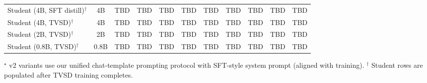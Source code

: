 \begin{table}[t]
{\begin{tabular}{@{}l c cc cc cc c cc@{}}
\rowcolor{blue!5}
Student (4B, SFT distill)$^\dagger$     & 4B    & TBD  & TBD  & TBD & TBD & TBD & TBD & TBD & TBD  & TBD \\
\rowcolor{blue!5}
Student (4B, TVSD)$^\dagger$     & 4B    & TBD  & TBD  & TBD & TBD & TBD & TBD & TBD & TBD  & TBD \\
\rowcolor{blue!5}
Student (2B, TVSD)$^\dagger$     & 2B    & TBD  & TBD  & TBD & TBD & TBD & TBD & TBD & TBD  & TBD \\
\rowcolor{blue!5}
Student (0.8B, TVSD)$^\dagger$   & 0.8B  & TBD  & TBD  & TBD & TBD & TBD & TBD & TBD & TBD  & TBD \\
\bottomrule
\end{tabular}%
}
\vspace{-2pt}

\footnotesize $^\star$ v2 variants use our unified chat-template prompting protocol
with SFT-style system prompt (aligned with training).
$^\dagger$ Student rows are populated after TVSD training completes.
\end{table}
